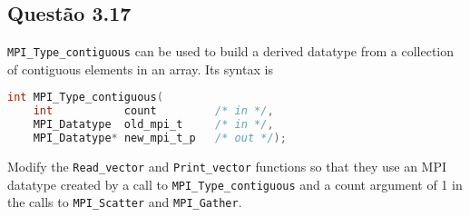 

\subsection{Questão 3.17}

\texttt{MPI\_Type\_contiguous} can be used to build a derived datatype from a collection of contiguous elements in an array. Its syntax is

\begin{lstlisting}[language=C]
int MPI_Type_contiguous(
    int           count         /* in */,
    MPI_Datatype  old_mpi_t     /* in */,
    MPI_Datatype* new_mpi_t_p   /* out */);
\end{lstlisting}

Modify the \texttt{Read\_vector} and \texttt{Print\_vector} functions so that they use an MPI datatype created by a call to \texttt{MPI\_Type\_contiguous} and a count
argument of 1 in the calls to \texttt{MPI\_Scatter} and \texttt{MPI\_Gather}.\\





